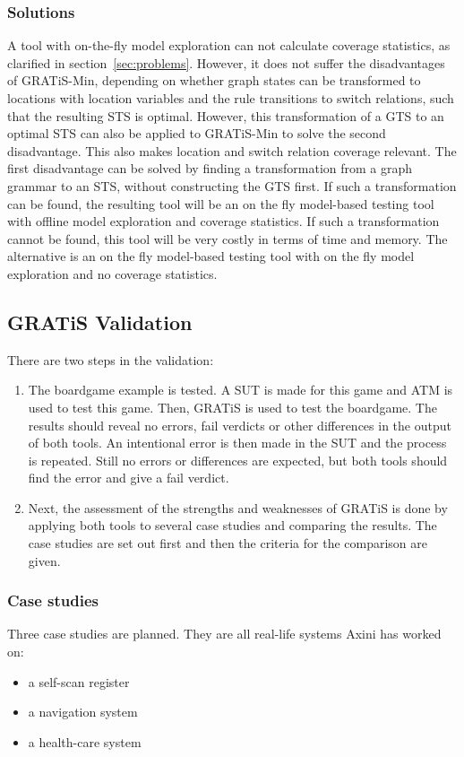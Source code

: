 \subsubsection{Solutions}
A tool with on-the-fly model exploration can not calculate coverage statistics, as clarified in section~\ref{sec:problems}. However, it does not suffer the disadvantages of GRATiS-Min, depending on whether graph states can be transformed to locations with location variables and the rule transitions to switch relations, such that the resulting STS is optimal. However, this transformation of a GTS to an optimal STS can also be applied to GRATiS-Min to solve the second disadvantage. This also makes location and switch relation coverage relevant. The first disadvantage can be solved by finding a transformation from a graph grammar to an STS, without constructing the GTS first. If such a transformation can be found, the resulting tool will be an on the fly model-based testing tool with offline model exploration and coverage statistics. If such a transformation cannot be found, this tool will be very costly in terms of time and memory. The alternative is an on the fly model-based testing tool with on the fly model exploration and no coverage statistics.

\subsection{GRATiS Validation}\label{sec:research_methods_validation}
There are two steps in the validation:
\begin{enumerate}
  \item The boardgame example is tested. A SUT is made for this game and ATM is used to test this game. Then, GRATiS is used to test the boardgame. The results should reveal no errors, fail verdicts or other differences in the output of both tools. An intentional error is then made in the SUT and the process is repeated. Still no errors or differences are expected, but both tools should find the error and give a fail verdict.
  \item Next, the assessment of the strengths and weaknesses of GRATiS is done by applying both tools to several case studies and comparing the results. The case studies are set out first and then the criteria for the comparison are given.
\end{enumerate}

\subsubsection{Case studies}
Three case studies are planned. They are all real-life systems Axini has worked on:
\begin{itemize}
  \item a self-scan register
  \item a navigation system
  \item a health-care system
\end{itemize}  

